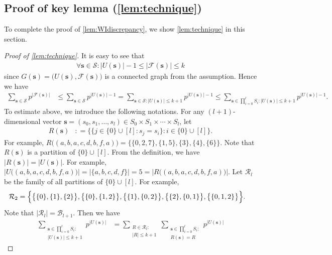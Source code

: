 \documentclass[letterpaper,11pt]{article}
\newcommand{\Vs}{U}
\newcommand{\Es}{F}
\def\defeq{\mathrel{\mathop:}=}%
\begin{document}
\subsection[Proof of key lemma]{Proof of key lemma (\cref{lem:technique})}\label{sec:technique}
To complete the proof of \cref{lem:WIdiscrepancy}, we show \cref{lem:technique} in this section.
\begin{proof}[Proof of \cref{lem:technique}]
It is easy to see that 
\begin{align*}
\forall \mathbf{s}\in \mathcal{S}: |\Vs(\mathbf{s})|-1\leq |\mathcal{F}(\mathbf{s})|\leq k
\end{align*}
since $G(\mathbf{s})=\bigl(\Vs(\mathbf{s}),\mathcal{\Es}(\mathbf{s})\bigr)$ is a connected graph from the assumption.
Hence we have
\begin{align}
\sum_{\mathbf{s}\in \mathcal{S}}p^{|\mathcal{\Es}(\mathbf{s})|}
&\leq \sum_{\mathbf{s}\in \mathcal{S}}p^{|\Vs(\mathbf{s})|-1}
= \sum_{\mathbf{s}\in \mathcal{S}:|\Vs(\mathbf{s})|\leq k+1}p^{|\Vs(\mathbf{s})|-1}
\leq \sum_{\mathbf{s}\in \prod_{i=0}^{l}S_i:|\Vs(\mathbf{s})|\leq k+1}p^{|\Vs(\mathbf{s})|-1}. \label{eqn:C2_1}
\end{align}
To estimate above, we introduce the following notations.
For any $(l+1)$-dimensional vector $\mathbf{s}=(s_0, s_1, \ldots, s_{l})\in S_0\times S_1\times \cdots \times S_l$, 
let 
\begin{align*}
R(\mathbf{s})&\defeq \bigl\{ \{j\in \{0\}\cup [l]: s_j=s_i\} : i\in \{0\}\cup [l]\bigr\}.
\end{align*}
For example, $R\bigl((a,b,a,c,d,b,f,a)\bigr)=\bigl\{\{0,2,7\}, \{1,5\}, \{3\}, \{4\}, \{6\}\bigr\}$.
Note that $R(\mathbf{s})$ is a partition of $\{0\}\cup [l]$.
From the definition, we have $|R(\mathbf{s})|=|\Vs(\mathbf{s})|$. 
For example, $|U\bigl((a,b,a,c,d,b,f,a)\bigr)|=|\{a,b,c,d,f\}|=5=|R\bigl((a,b,a,c,d,b,f,a)\bigr)|$.
Let $\mathcal{R}_l$ be the family of all partitions of $\{0\}\cup [l]$. 
%
For example, 
\begin{align*}
\mathcal{R}_2
&=
\Bigl\{
\bigl\{ \{0\},\{1\},\{2\} \bigr\},
\bigl\{ \{0\},\{1,2\} \bigr\},
\bigl\{ \{1\},\{0,2\} \bigr\},
\bigl\{ \{2\},\{0,1\} \bigr\},
\bigl\{ \{0,1,2\} \bigr\}
\Bigr\}.
\end{align*}
%
Note that $|\mathcal{R}_l|=\mathcal{B}_{l+1}$.
Then we have
\begin{align}
\sum_{\substack{\mathbf{s}\in \prod_{i=0}^l S_i:\\ |\Vs(\mathbf{s})| \leq k+1}}p^{|\Vs(\mathbf{s})|}
&=\sum_{\substack{R\in \mathcal{R}_{l}:\\|R|\leq k+1}}\sum_{\substack{\mathbf{s}\in \prod_{i=0}^l S_i:  \\ R(\mathbf{s})=R}}p^{|\Vs(\mathbf{s})|}

\end{align}
\end{proof}
\end{document}
